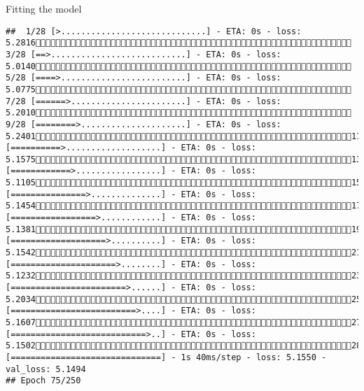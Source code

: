\documentclass[
  ignorenonframetext,
]{beamer}
\begin{document}
\begin{frame}[fragile]{Fitting the model}
\begin{verbatim}
##  1/28 [>.............................] - ETA: 0s - loss: 5.2816 3/28 [==>...........................] - ETA: 0s - loss: 5.0140 5/28 [====>.........................] - ETA: 0s - loss: 5.0775 7/28 [======>.......................] - ETA: 0s - loss: 5.2010 9/28 [========>.....................] - ETA: 0s - loss: 5.240111/28 [==========>...................] - ETA: 0s - loss: 5.157513/28 [============>.................] - ETA: 0s - loss: 5.110515/28 [===============>..............] - ETA: 0s - loss: 5.145417/28 [=================>............] - ETA: 0s - loss: 5.138119/28 [===================>..........] - ETA: 0s - loss: 5.154221/28 [=====================>........] - ETA: 0s - loss: 5.123223/28 [=======================>......] - ETA: 0s - loss: 5.203425/28 [=========================>....] - ETA: 0s - loss: 5.160727/28 [===========================>..] - ETA: 0s - loss: 5.150228/28 [==============================] - 1s 40ms/step - loss: 5.1550 - val_loss: 5.1494
## Epoch 75/250

\end{verbatim}
\end{frame}
\end{document}
